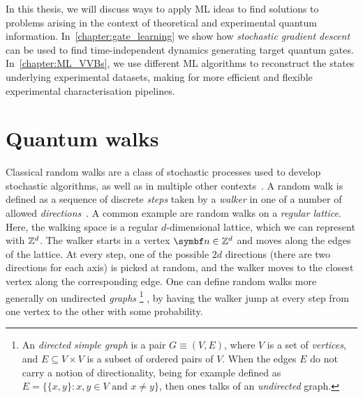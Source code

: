 In this thesis, we will discuss ways to apply ML ideas to find solutions to problems arising in the context of theoretical and experimental quantum information.
In~\cref{chapter:gate_learning} we show how \emph{stochastic gradient descent} can be used to find time-independent dynamics generating target quantum gates.
In~\cref{chapter:ML_VVBs}, we use different ML algorithms to reconstruct the states underlying experimental datasets, making for more efficient and flexible experimental characterisation pipelines.


\section{Quantum walks}
\label{sec:intro:QWs}



Classical random walks are a class of stochastic processes used to develop stochastic algorithms, as well as in multiple other contexts~\cite{berg1993random,fama1995random,motwani1995randomized,hughes1996random,schoning1999probabilistic,codling2008random}.
A random walk is defined as a sequence of discrete \textit{steps} taken by a \textit{walker} in one of a number of allowed \emph{directions}~\cite{lovasz1993random}.
A common example are random walks on a \textit{regular lattice}. Here, the walking space is a regular $d$-dimensional lattice, which we can represent with ${\mathbb{Z}}^d$. The walker starts in a vertex $\bs n\in\ZZ^d$ and moves along the edges of the lattice.
At every step, one of the possible $2d$ directions (there are two directions for each axis) is picked at random, and the walker moves to the closest vertex along the corresponding edge.
One can define random walks more generally on undirected \textit{graphs}
\footnote{An \textit{directed simple graph} is a pair $G\equiv (V,E)$, where $V$ is a set of \textit{vertices}, and $E\subseteq V\times V$ is a subset of ordered pairs of $V$. When the edges $E$ do not carry a notion of directionality, being for example defined as $E=\{\{x,y\} : x,y\in V\text{ and }x\neq y\}$, then ones talks of an \textit{undirected} graph.}
, by having the walker jump at every step from one vertex to the other with some probability.

